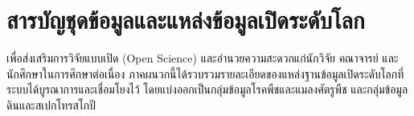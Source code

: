 \chapter{สารบัญชุดข้อมูลและแหล่งข้อมูลเปิดระดับโลก}
\label{app:dataset_catalog}

เพื่อส่งเสริมการวิจัยแบบเปิด (Open Science) และอำนวยความสะดวกแก่นักวิจัย คณาจารย์ และนักศึกษาในการศึกษาต่อเนื่อง ภาคผนวกนี้ได้รวบรวมรายละเอียดของแหล่งฐานข้อมูลเปิดระดับโลกที่ระบบได้บูรณาการและเชื่อมโยงไว้ โดยแบ่งออกเป็นกลุ่มข้อมูลโรคพืชและแมลงศัตรูพืช และกลุ่มข้อมูลดินและสเปกโทรสโกปี

\label{sec:plant_open_repos}

